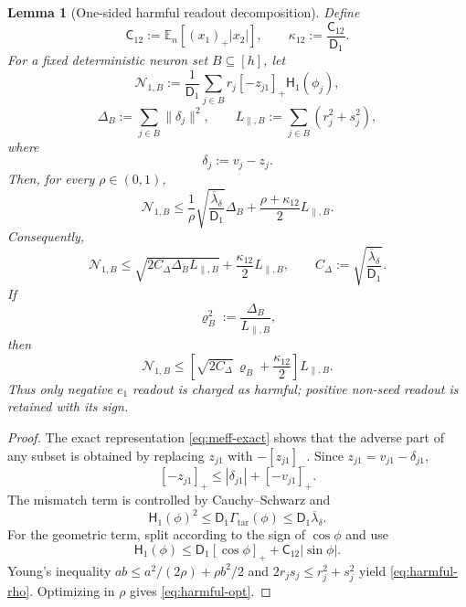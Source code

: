 \documentclass{article} %
\theoremstyle{plain}
\newtheorem{lemma}[theorem]{Lemma}
\theoremstyle{definition}
\theoremstyle{remark}
\begin{document}

\begin{lemma}[One-sided harmful readout decomposition]
\label{lem:one-sided-harmful-readout}
Define
\[
\mathsf C_{12}
:=
\mathbb E_n[(x_1)_+|x_2|],
\qquad
\kappa_{12}
:=
\frac{\mathsf C_{12}}{\mathsf D_1}.
\]
For a fixed deterministic neuron set $B\subseteq[h]$, let
\[
\mathcal N_{1,B}
:=
\frac1{\mathsf D_1}
\sum_{j\in B}
r_j[-z_{j1}]_+\mathsf H_1(\phi_j),
\]
\[
\Delta_B
:=
\sum_{j\in B}\|\delta_j\|^2,
\qquad
L_{\parallel,B}
:=
\sum_{j\in B}(r_j^2+s_j^2),
\]
where
\[
\delta_j:=v_j-z_j.
\]
Then, for every $\rho\in(0,1)$,
\[
\boxed{
\mathcal N_{1,B}
\le
\frac1\rho
\sqrt{
\frac{\overline\lambda_\delta}{\mathsf D_1}
}
\Delta_B
+
\frac{\rho+\kappa_{12}}2
L_{\parallel,B}.
}
\tag{harmful-rho}\label{eq:harmful-rho}
\]
Consequently,
\[
\boxed{
\mathcal N_{1,B}
\le
\sqrt{2C_\Delta\Delta_BL_{\parallel,B}}
+
\frac{\kappa_{12}}2L_{\parallel,B},
\qquad
C_\Delta
:=
\sqrt{
\frac{\overline\lambda_\delta}{\mathsf D_1}
}.
}
\tag{harmful-opt}\label{eq:harmful-opt}
\]
If
\[
\varrho_B^2
:=
\frac{\Delta_B}{L_{\parallel,B}},
\]
then
\[
\boxed{
\mathcal N_{1,B}
\le
\left[
\sqrt{2C_\Delta}\,\varrho_B
+
\frac{\kappa_{12}}2
\right]
L_{\parallel,B}.
}
\]
Thus only negative $e_1$ readout is charged as harmful; positive non-seed
readout is retained with its sign.
\end{lemma}

\begin{proof}
The exact representation \eqref{eq:meff-exact} shows that the adverse part of
any subset is obtained by replacing $z_{j1}$ with $-[z_{j1}]_-$.  Since
$z_{j1}=v_{j1}-\delta_{j1}$,
\[
[-z_{j1}]_+
\le
|\delta_{j1}|+[-v_{j1}]_+.
\]
The mismatch term is controlled by Cauchy--Schwarz and
\[
\mathsf H_1(\phi)^2
\le
\mathsf D_1\Gamma_{\mathrm{tar}}(\phi)
\le
\mathsf D_1\overline\lambda_\delta.
\]
For the geometric term, split according to the sign of $\cos\phi$ and use
\[
\mathsf H_1(\phi)
\le
\mathsf D_1[\cos\phi]_+
+
\mathsf C_{12}|\sin\phi|.
\]
Young's inequality
$ab\le a^2/(2\rho)+\rho b^2/2$ and
$2r_js_j\le r_j^2+s_j^2$ yield \eqref{eq:harmful-rho}.  Optimizing in $\rho$
gives \eqref{eq:harmful-opt}.
\end{proof}

\end{document}
